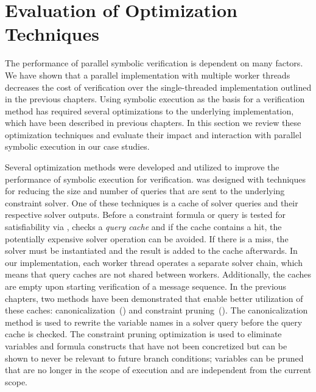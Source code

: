 \section{Evaluation of Optimization Techniques}
\label{sec:par:evalopt}

The performance of parallel symbolic verification is dependent on many
factors. We have shown that a parallel implementation with multiple
worker threads decreases the cost of verification over the
single-threaded implementation outlined in the previous chapters.
Using symbolic execution as the basis for a verification method has
required several optimizations to the underlying implementation, which
have been described in previous chapters. In this section we review
these optimization techniques and evaluate their impact and
interaction with parallel symbolic execution in our case studies.

Several optimization methods were developed and utilized to improve
the performance of symbolic execution for verification. \klee was
designed with techniques for reducing the size and number of queries
that are sent to the underlying constraint solver. One of these
techniques is a cache of solver queries and their respective solver
outputs. Before a constraint formula or query is tested for
satisfiability via \stp, \klee checks a \emph{query cache} and if the
cache contains a hit, the potentially expensive solver operation can
be avoided. If there is a miss, the solver must be instantiated and
the result is added to the cache afterwards. In our implementation,
each worker thread operates a separate solver chain, which means that
\klee query caches are not shared between workers. Additionally,  the
caches are empty upon starting verification of a message sequence. In
the previous chapters, two methods have been demonstrated that enable
better utilization of these caches:
canonicalization~() and
constraint pruning~(). The
canonicalization method is used to rewrite the variable names in a
solver query before the query cache is checked. The constraint pruning
optimization is used to eliminate variables and formula constructs
that have not been concretized but can be shown to never be relevant
to future branch conditions; variables can be pruned that are no
longer in the scope of execution and are independent from the current
scope.

